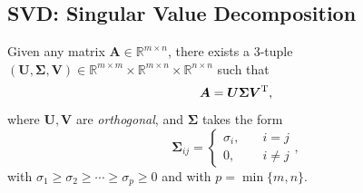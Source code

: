\subsection{SVD: Singular Value Decomposition}
\begin{theorem}[SVD]
Given any matrix $\bm A\in\mathbb{R}^{m\times n}$, there exists a 3-tuple $(\bm U,\bm\Sigma,\bm V)\in\mathbb{R}^{m\times m}\times \mathbb{R}^{m\times n}\times \mathbb{R}^{n\times n}$ such that
\[
\bm A=\bm U\bm\Sigma\bm V^{\mathrm T},
\]
where $\bm U,\bm V$ are \emph{orthogonal}, and $\bm\Sigma$ takes the form
\[
\bm\Sigma_{ij}=\left\{
\begin{aligned}
\sigma_i,&\quad i=j\\
0,&\quad i\ne j
\end{aligned},
\right.
\]
with $\sigma_1\ge\sigma_2\ge\cdots\ge\sigma_p\ge0$ and with $p=\min\{m,n\}$.
\end{theorem}
